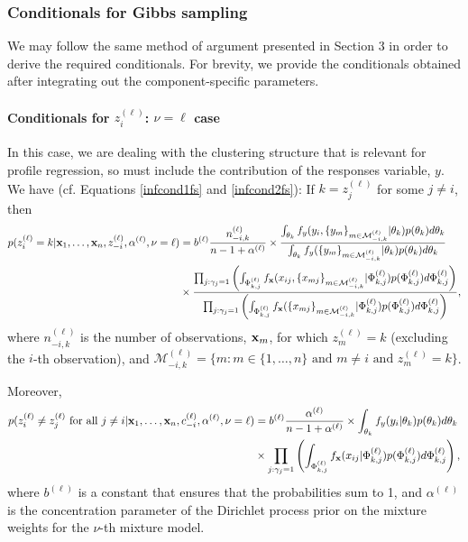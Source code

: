 \documentclass[12pt]{article}
\begin{document}
\subsubsection{Conditionals for Gibbs sampling}
We may follow the same method of argument presented in Section 3 in order to derive the required conditionals.  For brevity, we provide the conditionals obtained after integrating out the component-specific parameters.  
\paragraph{Conditionals for $z_i^{(\ell)}$: $\nu = \ell$ case}
In this case, we are dealing with the clustering structure that is relevant for profile regression, so must include the contribution of the responses variable, $y$.  We have (cf. Equations \eqref{infcond1fs} and \eqref{infcond2fs}):
\noindent If $k = z_j^{(\ell)}$ for some $j \ne i$, then\qquad
\begin{align}
p(z_i^{(\ell)}=k|{\bf x}_1,\ldots, {\bf x}_n,z_{-i}^{(\ell)}, \alpha^{(\ell)}, \nu = \ell) &= b^{(\ell)}\frac{n_{-i,k}^{(\ell)}}{n - 1 + \alpha^{(\ell)}} \times \frac{\int_{\theta_k}f_{y}(y_i,\{{ y}_{m}\}_{m\in \mathcal{M}^{(\ell)}_{-i,k}} | \theta_k) p(\theta_k) d\theta_k}{\int_{\theta_k}f_{y}(\{{ y}_{m}\}_{m\in \mathcal{M}^{(\ell)}_{-i,k}} | \theta_k) p(\theta_k) d\theta_k}     \notag\\ 
&\times \frac{\prod_{j: {\gamma_j} = 1} \left(\int_{\Phi^{(\ell)}_{k,j}}f_{{\bf x}}(x_{ij},\{{ x}_{mj}\}_{m\in \mathcal{M}^{(\ell)}_{-i,k}} | \Phi^{(\ell)}_{k,j}) p(\Phi^{(\ell)}_{k,j}) d\Phi^{(\ell)}_{k,j}\right)}{\prod_{j: {\gamma_j} = 1} \left(\int_{\Phi^{(\ell)}_{k,j}}f_{{\bf x}}(\{{ x}_{mj}\}_{m\in \mathcal{M}^{(\ell)}_{-i,k}} | \Phi^{(\ell)}_{k,j}) p(\Phi^{(\ell)}_{k,j}) d\Phi^{(\ell)}_{k,j}\right)}, \label{infcond1mc1}
\end{align}
where $n_{-i,k}^{(\ell)}$ is the number of observations, ${\bf x}_m$, for which $z_m^{(\ell)} = k$ (excluding the $i$-th observation), and $\mathcal{M}_{-i,k}^{(\ell)} = \{m : m \in \{1, \ldots, n \}\mbox{ and }  m \ne i\mbox{ and }  z_m^{(\ell)} = k \}$.


\noindent Moreover, \qquad
\begin{align}
p(z_i^{(\ell)} \ne z_j^{(\ell)} \mbox{ for all } j \ne i| {\bf x}_1,\ldots, {\bf x}_n, c^{(\ell)}_{-i}, \alpha^{(\ell)}, \nu = \ell) &= b^{(\ell)}\frac{\alpha^{(\ell)}}{n - 1 + \alpha^{(\ell)}} \times \int_{\theta_k}f_{y}(y_i | \theta_k) p(\theta_k) d\theta_k \notag \\&\times  \prod_{j: {\gamma_j} = 1} \left(\int_{\Phi^{(\ell)}_{k,j}}f_{{\bf x}}(x_{ij} | \Phi^{(\ell)}_{k,j}) p(\Phi^{(\ell)}_{k,j}) d\Phi^{(\ell)}_{k,j}\right),\label{infcond2mc1}
\end{align}
where $b^{(\ell)}$ is a constant that ensures that the probabilities sum to 1, and $\alpha^{(\ell)}$ is the concentration parameter of the Dirichlet process prior on the mixture weights for the $\nu$-th mixture model.  
\end{document}
